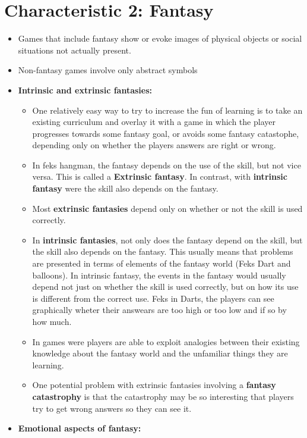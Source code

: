   \section*{Characteristic 2: Fantasy}
    \begin{itemize}
      \item Games that include fantasy show or evoke images of physical objects or social situations not actually present.
      \item Non-fantasy games involve only abstract symbols
      \item {\bf Intrinsic and extrinsic fantasies:}
        \begin{itemize}
          \item One relatively easy way to try to increase the fun of learning is to take an existing curriculum and overlay it with a game in which the player progresses towards some fantasy goal, or avoids some fantasy catastophe, depending only on whether the players answers are right or wrong. 
          \item In feks hangman, the fantasy depends on the use of the skill, but not vice versa. This is called a {\bf Extrinsic fantasy}. In contrast, with {\bf intrinsic fantasy} were the skill also depends on the fantasy. 
          \item Most {\bf extrinsic fantasies} depend only on whether or not the skill is used correctly.  
          \item In {\bf intrinsic fantasies}, not only does the fantasy depend on the skill, but the skill also depends on the fantasy. This usually means that problems are presented in terms of elements of the fantasy world (Feks Dart and balloons). In intrinsic fantasy, the events in the fantasy would usually depend not just on whether the skill is used correctly, but on how its use is different from the correct use. Feks in Darts, the players can see graphically wheter their answears are too high or too low and if so by how much.
          \item In games were players are able to exploit analogies between their existing knowledge about the fantasy world and the unfamiliar things they are learning. 
          \item One potential problem with extrinsic fantasies involving a {\bf fantasy catastrophy} is that the catastrophy may be so interesting that players try to get wrong answers so they can see it. 
        \end{itemize}
      \item {\bf Emotional aspects of fantasy:}

\end{itemize}
